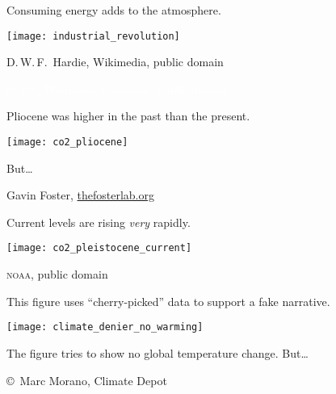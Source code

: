 \documentclass[t,handout]{beamer}  %
\begin{document}
%
%

%
%
%
%
\begin{frame}[t]{Consuming energy adds  to the atmosphere.}

	\texttt{[image: industrial\_revolution]}

	\vfilll
	
	\hfill \tiny D.\,W.\,F.~Hardie, Wikimedia, public domain

\end{frame}
%
{
\begin{frame}[b]

	\hfill \tiny \textcolor{white}{\textsc{us epa}, Wikimedia Commons, public domain}
\end{frame}
}
%
\begin{frame}{Pliocene  was higher in the past than the present.}
	
	\texttt{[image: co2\_pliocene]}\par
	
	\hangpara But\dots
	
	\vfilll
	
	\hfill \tiny Gavin Foster, \href{http://www.thefosterlab.org/blog/2015/11/11/is-this-the-last-year-below-400-ppm}{thefosterlab.org}
\end{frame}
%
\begin{frame}{Current  levels are rising \emph{very} rapidly.}
	
	{\centering
		\texttt{[image: co2\_pleistocene\_current]}\par
	}
	
	\vfilll
	
	\hfill \tiny \textsc{noaa}, public domain
\end{frame}
%
\begin{frame}[t]{This figure uses “cherry-picked” data to support a fake narrative.}
	
	{\centering
		\texttt{[image: climate\_denier\_no\_warming]}\par
	}
	
	The figure tries to show no global temperature change. But\dots
	
	\vfilll
	
	\hfill \tiny \copyright~Marc Morano, Climate Depot
\end{frame}
\end{document}
